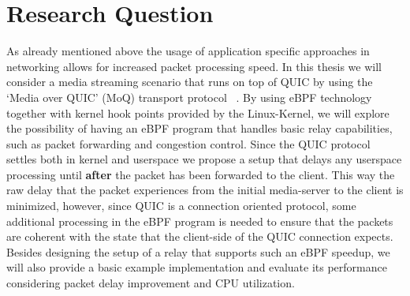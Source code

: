 \section{Research Question}\label{sec:research_question}

As already mentioned above the usage of application specific approaches in networking allows for increased packet processing speed.
In this thesis we will consider a media streaming scenario that runs on top of QUIC by using the `Media over QUIC' (MoQ) transport protocol
~\parencite{draft-moqtransport}.
By using eBPF technology together with kernel hook points provided by the Linux-Kernel, we will explore the possibility of having an eBPF 
program that handles basic relay capabilities, such as packet forwarding and congestion control.
Since the QUIC protocol settles both in kernel and userspace we propose a setup that delays any userspace processing until \textbf{after} the
packet has been forwarded to the client.
This way the raw delay that the packet experiences from the initial media-server to the client is minimized, however, since QUIC is a connection 
oriented protocol, some additional processing in the eBPF program is needed to ensure that the packets are coherent with the state that the 
client-side of the QUIC connection expects.
Besides designing the setup of a relay that supports such an eBPF speedup, we will also provide a basic example implementation and evaluate its
performance considering packet delay improvement and CPU utilization.